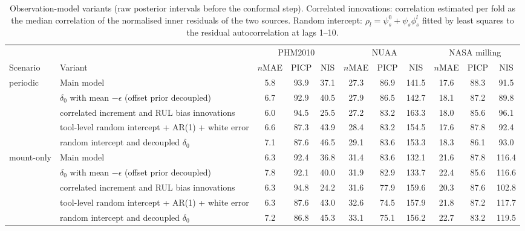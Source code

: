 \begin{table}[!htbp]
\centering
\caption{Observation-model variants (raw posterior intervals before the conformal step). Correlated innovations: correlation estimated per fold as the median correlation of the normalised inner residuals of the two sources. Random intercept: $\rho_l=\psi^0_s+\psi_s\phi_s^l$ fitted by least squares to the residual autocorrelation at lags 1--10.}
\label{tab:Svariants}
\footnotesize\setlength{\tabcolsep}{2.6pt}
\begin{tabular}{llccccccccc}
\toprule
 & & \multicolumn{3}{c}{PHM2010} & \multicolumn{3}{c}{NUAA} & \multicolumn{3}{c}{NASA milling}\\
\cmidrule(lr){3-5}\cmidrule(lr){6-8}\cmidrule(lr){9-11}
Scenario & Variant & $n$MAE & PICP & NIS & $n$MAE & PICP & NIS & $n$MAE & PICP & NIS\\
\midrule
periodic & Main model & 5.8 & 93.9 & 37.1 & 27.3 & 86.9 & 141.5 & 17.6 & 88.3 & 91.5\\
 & $\delta_0$ with mean $-\epsilon$ (offset prior decoupled) & 6.7 & 92.9 & 40.5 & 27.9 & 86.5 & 142.7 & 18.1 & 87.2 & 89.8\\
 & correlated increment and RUL bias innovations & 6.0 & 94.5 & 25.5 & 27.2 & 83.2 & 163.3 & 18.0 & 85.6 & 96.1\\
 & tool-level random intercept + AR(1) + white error & 6.6 & 87.3 & 43.9 & 28.4 & 83.2 & 154.5 & 17.6 & 87.8 & 92.4\\
 & random intercept and decoupled $\delta_0$ & 7.1 & 87.6 & 46.5 & 29.1 & 83.6 & 153.3 & 18.3 & 86.1 & 93.0\\
\midrule
mount-only & Main model & 6.3 & 92.4 & 36.8 & 31.4 & 83.6 & 132.1 & 21.6 & 87.8 & 116.4\\
 & $\delta_0$ with mean $-\epsilon$ (offset prior decoupled) & 7.8 & 92.1 & 40.0 & 31.9 & 82.9 & 133.7 & 22.4 & 85.6 & 116.6\\
 & correlated increment and RUL bias innovations & 6.3 & 94.8 & 24.2 & 31.6 & 77.9 & 159.6 & 20.3 & 87.6 & 102.8\\
 & tool-level random intercept + AR(1) + white error & 6.3 & 87.6 & 43.0 & 32.6 & 74.5 & 157.9 & 21.8 & 87.2 & 117.7\\
 & random intercept and decoupled $\delta_0$ & 7.2 & 86.8 & 45.3 & 33.1 & 75.1 & 156.2 & 22.7 & 83.2 & 119.5\\
\bottomrule
\end{tabular}
\end{table}
